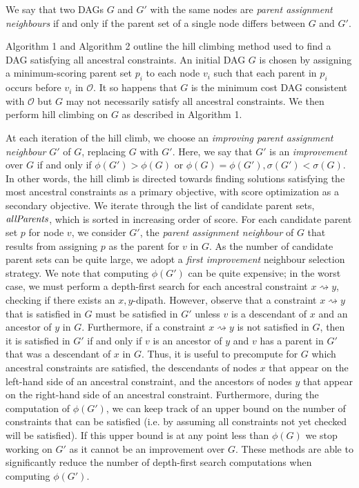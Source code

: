 \documentclass[twoside,11pt]{article}
\begin{document}
\begin{definition} 

We say that two DAGs $G$ and $G'$ with the same nodes
are \emph{parent assignment neighbours} if and only if the parent set of a single node differs between $G$ and $G'$.
\end{definition}

\medskip

Algorithm 1 and Algorithm 2 outline the hill climbing method used to find a DAG satisfying all ancestral constraints. An initial DAG $G$ is chosen by assigning
a minimum-scoring parent set $p_i$ to each node $v_i$ such that each parent in $p_i$ occurs before $v_i$ in $\mathcal{O}$. It so happens that $G$ is the minimum cost
DAG consistent with $\mathcal{O}$ but $G$ may not necessarily satisfy all ancestral constraints. We then perform hill climbing on $G$ as described in Algorithm 1.

\medskip
At each iteration of the hill climb, we choose an \emph{improving parent assignment neighbour} $G'$ of $G$, replacing $G$ with $G'$. 
Here, we say that $G'$ is an \emph{improvement} over $G$ if and only if $\phi(G') > \phi(G)$ or $\phi(G) = \phi(G'), \sigma(G') < \sigma(G)$. 
In other words, the hill climb is directed towards finding solutions satisfying the most ancestral constraints as a primary objective, 
with score optimization as a secondary objective. We iterate through the list of candidate parent sets, $\emph{allParents}$, which is sorted in increasing order of score. 
For each candidate parent set $p$ for node $v$, we consider $G'$, the \emph{parent assignment neighbour} of $G$ that results from assigning $p$ as the parent 
for $v$ in $G$. As the number of candidate parent sets can be quite large, we adopt a \emph{first improvement} neighbour selection strategy. 
We note that computing $\phi(G')$ can be quite expensive; in the worst case, we must perform a depth-first search for each ancestral constraint $x \rightsquigarrow y$,
checking if there exists an $x, y$-dipath. However, observe that a constraint $x \rightsquigarrow y$ that is satisfied in $G$
must be satisfied in $G'$ unless $v$ is a descendant of $x$ and an ancestor of $y$ in $G$. Furthermore, if a constraint $x \rightsquigarrow y$ is not satisfied in $G$,
then it is satisfied in $G'$ if and only if $v$ is an ancestor of $y$ and $v$ has a parent in $G'$ that was a descendant of $x$ in $G$. Thus, it is useful to precompute for $G$
 which ancestral constraints are satisfied, the descendants of nodes $x$ that appear on the left-hand side of an ancestral constraint, and the ancestors of 
nodes $y$ that appear on the right-hand side of an ancestral constraint. Furthermore, during the
computation of $\phi(G')$, we can keep track of an upper bound on the number of constraints that can be satisfied (i.e. by assuming all constraints not yet checked
will be satisfied). If this upper bound is at any point less than $\phi(G)$ we stop working on $G'$ as it cannot be an improvement over $G$. These methods are able to
significantly reduce the number of depth-first search computations when computing $\phi(G')$.
\end{document}
